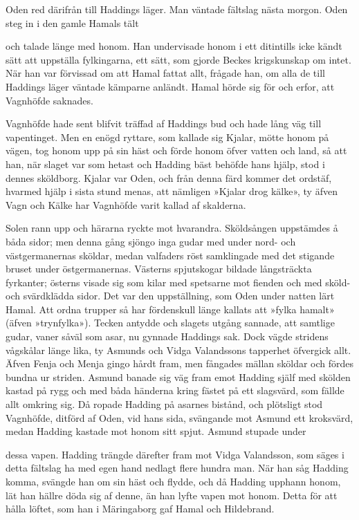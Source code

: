 Oden red därifrån till Haddings läger. Man väntade fältslag nästa
morgon. Oden steg in i den gamle Hamals tält

och talade länge med honom. Han undervisade honom i ett ditintills icke
kändt sätt att uppställa fylkingarna, ett sätt, som gjorde Beckes
krigskunskap om intet. När han var förvissad om att Hamal fattat allt,
frågade han, om alla de till Haddings läger väntade kämparne anländt.
Hamal hörde sig för och erfor, att Vagnhöfde saknades.

Vagnhöfde hade sent blifvit träffad af Haddings bud och hade lång väg
till vapentinget. Men en enögd ryttare, som kallade sig Kjalar, mötte
honom på vägen, tog honom upp på sin häst och förde honom öfver vatten
och land, så att han, när slaget var som hetast och Hadding bäst behöfde
hans hjälp, stod i dennes sköldborg. Kjalar var Oden, och från denna
färd kommer det ordstäf, hvarmed hjälp i sista stund menas, att nämligen
»Kjalar drog kälke», ty äfven Vagn och Kälke har Vagnhöfde varit kallad
af skalderna.

Solen rann upp och härarna ryckte mot hvarandra. Sköldsången uppstämdes
å båda sidor; men denna gång sjöngo inga gudar med under nord- och
västgermanernas sköldar, medan valfaders röst samklingade med det
stigande bruset under östgermanernas. Västerns spjutskogar bildade
långsträckta fyrkanter; österns visade sig som kilar med spetsarne mot
fienden och med sköld- och svärdklädda sidor. Det var den uppställning,
som Oden under natten lärt Hamal. Att ordna trupper så har fördenskull
länge kallats att »fylka hamalt» (äfven »trynfylka»). Tecken antydde och
slagets utgång sannade, att samtlige gudar, vaner såväl som asar, nu
gynnade Haddings sak. Dock vägde stridens vågskålar länge lika, ty
Asmunds och Vidga Valandssons tapperhet öfvergick allt. Äfven Fenja och
Menja gingo hårdt fram, men fångades mällan sköldar och fördes bundna ur
striden. Asmund banade sig väg fram emot Hadding själf med skölden
kastad på rygg och med båda händerna kring fästet på ett slagsvärd, som
fällde allt omkring sig. Då ropade Hadding på asarnes bistånd, och
plötsligt stod Vagnhöfde, ditförd af Oden, vid hans sida, svängande mot
Asmund ett kroksvärd, medan Hadding kastade mot honom sitt spjut. Asmund
stupade under

dessa vapen. Hadding trängde därefter fram mot Vidga Valandsson, som
säges i detta fältslag ha med egen hand nedlagt flere hundra man. När
han såg Hadding komma, svängde han om sin häst och flydde, och då
Hadding upphann honom, lät han hällre döda sig af denne, än han lyfte
vapen mot honom. Detta för att hålla löftet, som han i Märingaborg gaf
Hamal och Hildebrand.


